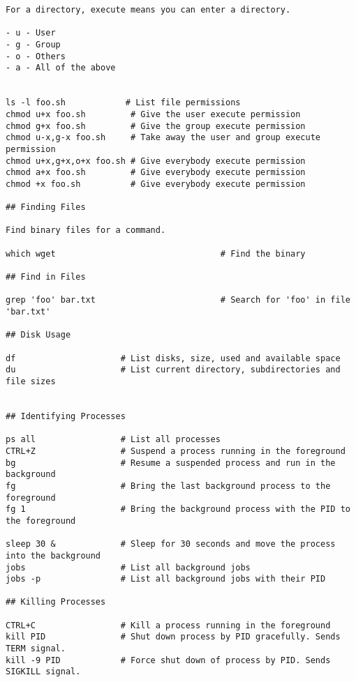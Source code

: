 \documentclass[12pt]{article}
\begin{document}
\begin{verbatim}
For a directory, execute means you can enter a directory.

- u - User
- g - Group
- o - Others
- a - All of the above


ls -l foo.sh            # List file permissions
chmod u+x foo.sh         # Give the user execute permission
chmod g+x foo.sh         # Give the group execute permission
chmod u-x,g-x foo.sh     # Take away the user and group execute permission
chmod u+x,g+x,o+x foo.sh # Give everybody execute permission
chmod a+x foo.sh         # Give everybody execute permission
chmod +x foo.sh          # Give everybody execute permission

## Finding Files

Find binary files for a command.

which wget                                 # Find the binary

## Find in Files

grep 'foo' bar.txt                         # Search for 'foo' in file 'bar.txt'

## Disk Usage

df                     # List disks, size, used and available space
du                     # List current directory, subdirectories and file sizes


## Identifying Processes

ps all                 # List all processes
CTRL+Z                 # Suspend a process running in the foreground
bg                     # Resume a suspended process and run in the background
fg                     # Bring the last background process to the foreground
fg 1                   # Bring the background process with the PID to the foreground

sleep 30 &             # Sleep for 30 seconds and move the process into the background
jobs                   # List all background jobs
jobs -p                # List all background jobs with their PID

## Killing Processes

CTRL+C                 # Kill a process running in the foreground
kill PID               # Shut down process by PID gracefully. Sends TERM signal.
kill -9 PID            # Force shut down of process by PID. Sends SIGKILL signal.
\end{verbatim}
\end{document}
